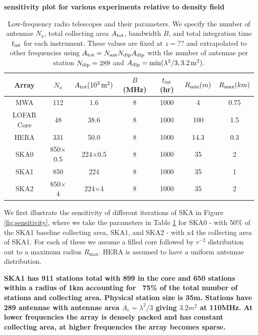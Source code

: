 \documentclass{PoS}
\begin{document}
{\bf sensitivity plot for various experiments relative to density field}

\begin{table}[htdp]
\caption{Low-frequency radio telescopes and their parameters.  We specify the number of antennae $N_a$, total collecting area $A_{\rm tot}$, bandwidth $B$, and total integration time $t_{\rm int}$ for each instrument. These values are fixed at $z=??$ and extrapolated to other frequencies using $A_{\rm tot}=N_{\rm ant}N_{\rm dip}A_{\rm dip}$ with the number of antennae per station $N_{\rm dip}=289$ and $A_{\rm dip}=\min(\lambda^2/3,3.2\,{ \rm m^2})$.}
\begin{center}
\begin{tabular}{ccccccc}
\hline
\hline
Array & $N_a$ & $A_{\rm tot}(10^3\,{\rm m^2})$ & $B$ (MHz) & $t_{\rm int}$ (hr)& $R_{\rm min} (m)$ & $R_{\rm max} (km)$\\
\hline
MWA & 112 & 1.6  & 8 & 1000 & 4 & 0.75\\
LOFAR Core & 48 & 38.6  & 8 & 1000 & 100 & 1.5\\
HERA & 331 & 50.0  & 8 & 1000 & 14.3 & 0.3\\
SKA0 & 850$\times$0.5 & 224$\times$0.5  & 8 & 1000 & 35 & 2\\
SKA1 & 850 & 224  & 8 & 1000 & 35 & 1\\
SKA2 & 850$\times$4 & 224$\times$4 & 8 & 1000 & 35 & 2\\
\hline
\hline
\end{tabular}
\end{center}
\label{tab:telescopes}
\end{table}%

We first illustrate the sensitivity of different iterations of SKA in Figure \ref{fig:sensitivity}, where we take the parameters in Table \ref{tab:telescopes} for SKA0 - with 50\% of the SKA1 baseline collecting area, SKA1, and SKA2 - with x4 the collecting area of SKA1. For each of these we assume a filled core followed by $r^{-2}$ distribution out to a maximum radius $R_{\max}$. HERA is assumed to have a uniform antennae distribution.

{\bf SKA1 has 911 stations total with 899 in the core and 650 stations within a radius of 1km accounting for ~75\% of the total number of stations and collecting area. Physical station size is 35m. Stations have 289 antennae with antennae area $A_e=\lambda^2/3$ giving $3.2m^2$ at 110MHz. At lower frequencies the array is densely packed and has constant collecting area, at higher frequencies the array becomes sparse.}
\end{document}
